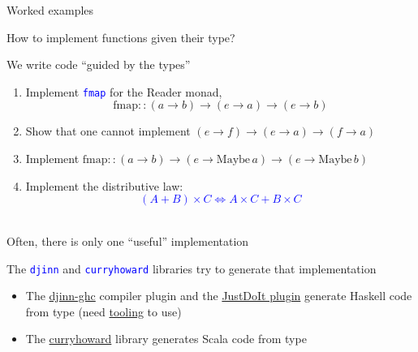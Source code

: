 \documentclass[english]{beamer}
\begin{document}
\begin{frame}{Worked examples}

How to implement functions given their type?

We write code ``guided by the types''
\begin{enumerate}
\item Implement \texttt{\textcolor{blue}{\footnotesize{}fmap}} for the Reader
monad,{\footnotesize{}
\[
\text{fmap}::\left(a\rightarrow b\right)\rightarrow\left(e\rightarrow a\right)\rightarrow\left(e\rightarrow b\right)
\]
}{\footnotesize \par}
\item Show that one cannot implement{\footnotesize{} $\left(e\rightarrow f\right)\rightarrow\left(e\rightarrow a\right)\rightarrow\left(f\rightarrow a\right)$}{\footnotesize \par}
\item Implement {\footnotesize{}$\text{fmap}::\left(a\rightarrow b\right)\rightarrow\left(e\rightarrow\text{Maybe}\,a\right)\rightarrow\left(e\rightarrow\text{Maybe}\,b\right)$}{\footnotesize \par}
\item Implement the distributive law: \texttt{\textcolor{blue}{\footnotesize{}
\[
\left(A+B\right)\times C\Leftrightarrow A\times C+B\times C
\]
}}{\footnotesize \par}
\end{enumerate}
Often, there is only one ``useful'' implementation

The \texttt{\textcolor{blue}{\footnotesize{}djinn}} and \texttt{\textcolor{blue}{\footnotesize{}curryhoward}}
libraries try to generate that implementation
\begin{itemize}
\item The \href{https://hackage.haskell.org/package/djinn-ghc}{djinn-ghc}
compiler plugin and the \href{https://github.com/nomeata/ghc-justdoit}{JustDoIt plugin}
generate Haskell code from type (need \href{https://github.com/serras/emacs-haskell-tutorial/blob/master/tutorial.md\#working-with-holes}{tooling}
to use)
\item The \href{https://github.com/Chymyst/curryhoward}{curryhoward} library
generates Scala code from type 
\end{itemize}
\end{frame}
\end{document}
